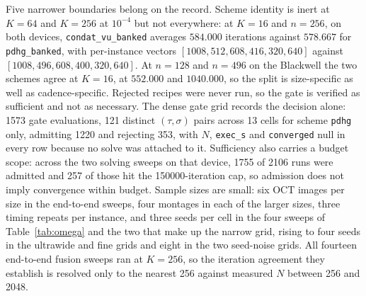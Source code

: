 Five narrower boundaries belong on the record. Scheme identity is inert at
$K=64$ and $K=256$ at $10^{-4}$ but not everywhere: at $K=16$ and $n{=}256$, on
both devices, \texttt{condat\_vu\_banked} averages $584.000$ iterations against
$578.667$ for \texttt{pdhg\_banked}, with per-instance vectors
$[1008, 512, 608, 416, 320, 640]$ against $[1008, 496, 608, 400, 320, 640]$. At
$n{=}128$ and $n{=}496$ on the Blackwell the two schemes agree at $K=16$, at
$552.000$ and $1040.000$, so the split is size-specific as well as
cadence-specific.
Rejected recipes were never run, so the gate is verified as sufficient and not
as necessary. The dense gate grid records the decision alone: 1573 gate
evaluations, 121 distinct $(\tau, \sigma)$ pairs across 13 cells for scheme
\texttt{pdhg} only, admitting 1220 and rejecting 353, with $N$,
\texttt{exec\_s} and \texttt{converged} null in every row because no solve was
attached to it. Sufficiency also carries a budget scope: across the two solving
sweeps on that device, 1755 of 2106 runs were admitted and 257 of those hit the
150000-iteration cap, so admission does not imply convergence within budget.
Sample sizes are small: six OCT images per size in the end-to-end sweeps, four
montages in each of the larger sizes, three timing repeats per instance, and
three seeds per cell in the four sweeps of Table~\ref{tab:omega} and the two
that make up the narrow grid, rising to four seeds in the ultrawide and fine
grids and eight in the two seed-noise grids. All fourteen end-to-end fusion
sweeps ran at $K=256$, so the iteration agreement they establish is resolved
only to the nearest 256 against measured $N$ between 256 and 2048.
